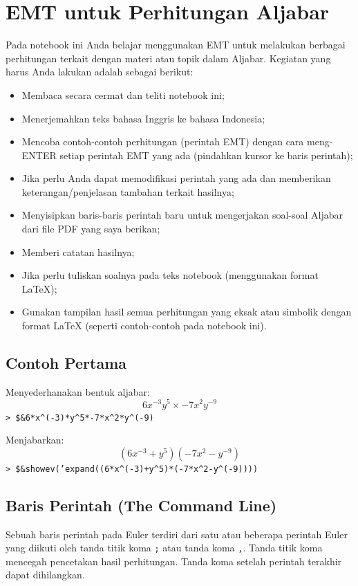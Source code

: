 \documentclass[11pt, a4paper]{article}
\newcommand{\emtcmd}[1]{\noindent\texttt{\textcolor{emtcommand}{>}\ #1}\par\smallskip}
\begin{document}
\section*{EMT untuk Perhitungan Aljabar}

Pada notebook ini Anda belajar menggunakan EMT untuk melakukan berbagai perhitungan terkait dengan materi atau topik dalam Aljabar. Kegiatan yang harus Anda lakukan adalah sebagai berikut:

\begin{itemize}
    \item Membaca secara cermat dan teliti notebook ini;
    \item Menerjemahkan teks bahasa Inggris ke bahasa Indonesia;
    \item Mencoba contoh-contoh perhitungan (perintah EMT) dengan cara meng-ENTER setiap perintah EMT yang ada (pindahkan kursor ke baris perintah);
    \item Jika perlu Anda dapat memodifikasi perintah yang ada dan memberikan keterangan/penjelasan tambahan terkait hasilnya;
    \item Menyisipkan baris-baris perintah baru untuk mengerjakan soal-soal Aljabar dari file PDF yang saya berikan;
    \item Memberi catatan hasilnya;
    \item Jika perlu tuliskan soalnya pada teks notebook (menggunakan format LaTeX);
    \item Gunakan tampilan hasil semua perhitungan yang eksak atau simbolik dengan format LaTeX (seperti contoh-contoh pada notebook ini).
\end{itemize}

\subsection*{Contoh Pertama}

Menyederhanakan bentuk aljabar:
$$6x^{-3}y^5 \times -7x^2y^{-9}$$
\emtcmd{\$\&6*x\^{}(-3)*y\^{}5*-7*x\^{}2*y\^{}(-9)}

Menjabarkan:
$$(6x^{-3}+y^5)(-7x^2-y^{-9})$$
\emtcmd{\$\&showev('expand((6*x\^{}(-3)+y\^{}5)*(-7*x\^{}2-y\^{}(-9))))}

\subsection*{Baris Perintah (The Command Line)}

Sebuah baris perintah pada Euler terdiri dari satu atau beberapa perintah Euler yang diikuti oleh tanda titik koma \texttt{;} atau tanda koma \texttt{,}. Tanda titik koma mencegah pencetakan hasil perhitungan. Tanda koma setelah perintah terakhir dapat dihilangkan.
\end{document}
